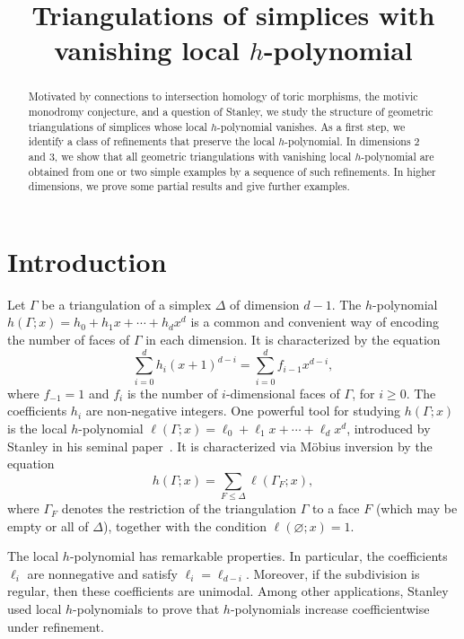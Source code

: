 \documentclass[10pt]{amsart}
\author{\firstname{Andr{\'e}}  \lastname{de Moura}}
\author{\firstname{Elijah} \lastname{Gunther}}
\author{\firstname{Sam} \lastname{Payne}}
\author{\firstname{Jason} \lastname{Schuchardt}}
\author{\firstname{Alan} \lastname{Stapledon}}
\title{Triangulations of simplices with vanishing local $h$-polynomial}
\begin{document}
\begin{abstract}
Motivated by connections to intersection homology of toric morphisms, the motivic monodromy conjecture, and a question of Stanley, we study the structure of geometric triangulations of simplices whose local $h$-polynomial vanishes. As a first step, we identify a class of refinements that preserve the local $h$-polynomial. In dimensions 2 and 3, we show that all geometric triangulations with vanishing local $h$-polynomial are obtained from one or two simple examples by a sequence of such refinements. In higher dimensions, we prove some partial results and give further examples.
\end{abstract}
\maketitle




\section{Introduction}

Let $\Gamma$ be a triangulation of a simplex $\Delta$ of dimension $d-1$. 
The $h$-polynomial $h(\Gamma; x) = h_0 + h_1 x + \cdots + h_d x^d$ is a common and
convenient way of encoding the number of faces of $\Gamma$ in each dimension. 
It is characterized by the equation
\[
\sum_{i=0}^{d} h_i (x+1)^{d-i} = \sum_{i=0}^d f_{i-1} x^{d-i},
\]
where $f_{-1} = 1$ and $f_i$ is the number of $i$-dimensional faces of $\Gamma$,
for $i \geq 0$. The coefficients $h_i$ are non-negative integers. 
One powerful tool for studying $h(\Gamma;x)$ is the local $h$-polynomial
$\ell(\Gamma;x) = \ell_0 + \ell_1x + \cdots + \ell_d x^d$,
introduced by Stanley in his seminal paper~\cite{Stanley92}. 
It is characterized via M{\"o}bius inversion by the equation
\begin{equation} \label{eq:h=sum-of-l}
h(\Gamma;x) = \sum_{F \leq \Delta} \ell(\Gamma_F;x),
\end{equation}
where $\Gamma_F$ denotes the restriction of the triangulation $\Gamma$ to a face $F$
(which may be empty or all of $\Delta$), together with the condition $\ell(\varnothing; x) = 1$.

The local $h$-polynomial has remarkable properties. 
In particular, the coefficients $\ell_i$ are nonnegative and satisfy $ \ell_i = \ell_{d-i}$.
Moreover, if the subdivision is regular, then these coefficients are unimodal. 
Among other applications, Stanley used local $h$-polynomials to prove that $h$-polynomials
increase coefficientwise under refinement.
\end{document}
